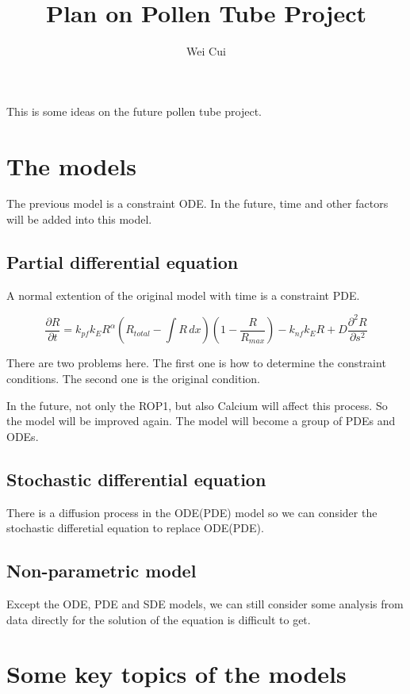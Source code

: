 \documentclass[12pt]{extarticle}
\title{Plan on Pollen Tube Project}
\author{Wei Cui}
\begin{document}
\maketitle

This is some ideas on the future pollen tube project.

\section{The models}

The previous model is a constraint ODE. In the future, time and other factors will be added into this model. 

\subsection{Partial differential equation}

A normal extention of the original model with time is a constraint PDE.

\begin{equation}
  \frac{\partial R}{\partial t} = k_{pf}k_{E}R^{\alpha}(R_{total} - \int R \,dx)(1 - \frac{R}{R_{max}}) - k_{nf}k_{E}R + D\frac{\partial^{2} R}{\partial s^{2}}
\end{equation}

There are two problems here. The first one is how to determine the constraint conditions. The second one is the original condition.

In the future, not only the ROP1, but also Calcium will affect this process. So the model will be improved again. The model will become a group of PDEs and ODEs.

\subsection{Stochastic differential equation}

There is a diffusion process in the ODE(PDE) model so we can consider the stochastic differetial equation to replace ODE(PDE).

\subsection{Non-parametric model}

Except the ODE, PDE and SDE models, we can still consider some analysis from data directly for the solution of the equation is difficult to get.

\section{Some key topics of the models}
\end{document}
